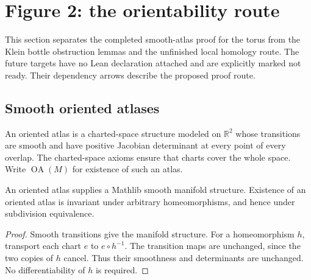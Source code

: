 \section{Figure 2: the orientability route}

This section separates the completed smooth-atlas proof for the torus from the
Klein bottle obstruction lemmas and the unfinished local homology route.
The future targets have no Lean declaration attached and are explicitly marked
not ready. Their dependency arrows describe the proposed proof route.

\subsection{Smooth oriented atlases}

\begin{definition}\label{def:oriented-atlas}

  An oriented atlas is a charted-space structure modeled on $\mathbb R^2$
  whose transitions are smooth and have positive Jacobian determinant at
  every point of every overlap. The charted-space axioms ensure that charts
  cover the whole space. Write $\operatorname{OA}(M)$ for existence of such an atlas.
\end{definition}

\begin{lemma}\label{lem:orientation-invariant}

  An oriented atlas supplies a Mathlib smooth manifold structure. Existence
  of an oriented atlas is invariant under arbitrary homeomorphisms, and hence
  under subdivision equivalence.
\end{lemma}
\begin{proof}

  Smooth transitions give the manifold structure. For a homeomorphism $h$,
  transport each chart $e$ to $e\circ h^{-1}$. The transition maps are unchanged,
  since the two copies of $h$ cancel. Thus their smoothness and determinants
  are unchanged. No differentiability of $h$ is required.
\end{proof}

